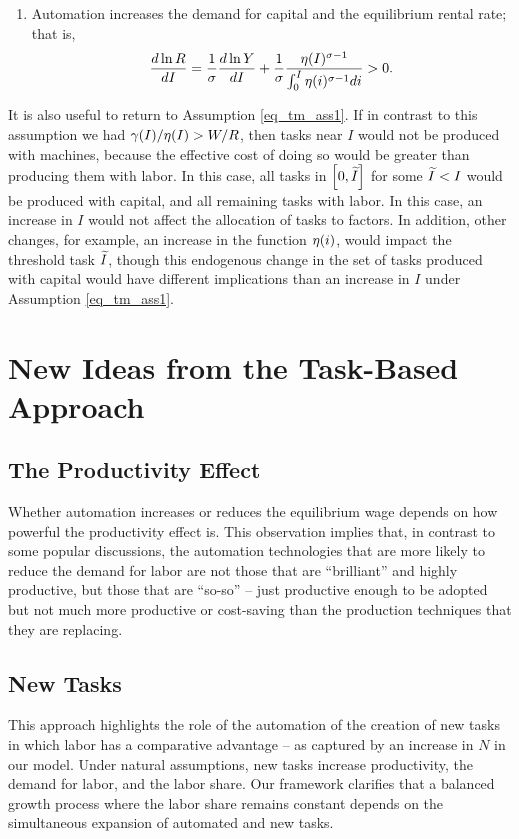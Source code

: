 \documentclass[12pt]{article}
\theoremstyle{definition}
\begin{document}
\begin{enumerate}[topsep=0pt, leftmargin=20pt, itemsep=0pt, label=(\arabic*)]
\item Automation increases the demand for capital and the equilibrium rental rate; that is, 
\begin{equation}
    \notag 
    \frac{d \ln R}{d I}=\frac{1}{\sigma} \frac{d \ln Y}{d I}+\frac{1}{\sigma} \frac{\eta(I)^{\sigma-1}}{\int_0^I \eta(i)^{\sigma-1} d i}>0 .
\end{equation}
\end{enumerate}


It is also useful to return to Assumption \ref{eq_tm_ass1}. If in contrast to this assumption we had $\gamma{\left( I \right)}/\eta{\left( I \right)} > W/R$, then tasks near $I$ would not be produced with machines, because the effective cost of doing so would be greater than producing them with labor. In this case, all tasks in $\left[ 0, \widetilde{I} \right]$ for some $\widetilde{I} < I$ would be produced with capital, and all remaining tasks with labor. In this case, an increase in $I$ would not affect the allocation of tasks to factors. In addition, other changes, for example, an increase in the function $\eta{\left( i \right)}$, would impact the threshold task $\widetilde{I}$, though this endogenous change in the set of tasks produced with capital would have different implications than an increase in $I$ under Assumption \ref{eq_tm_ass1}. 

\section{New Ideas from the Task-Based Approach}

\subsection{The Productivity Effect}

Whether automation increases or reduces the equilibrium wage depends on how powerful the productivity effect is. This observation implies that, in contrast to some popular discussions, the automation technologies that are more likely to reduce the demand for labor are not those that are ``brilliant'' and highly productive, but those that are ``so-so'' -- just productive enough to be adopted but not much more productive or cost-saving than the production techniques that they are replacing. 

\subsection{New Tasks}

This approach highlights the role of the automation of the creation of new tasks in which labor has a comparative advantage -- as captured by an increase in $N$ in our model. Under natural assumptions, new tasks increase productivity, the demand for labor, and the labor share. Our framework clarifies that a balanced growth process where the labor share remains constant depends on the simultaneous expansion of automated and new tasks. 
\end{document}
